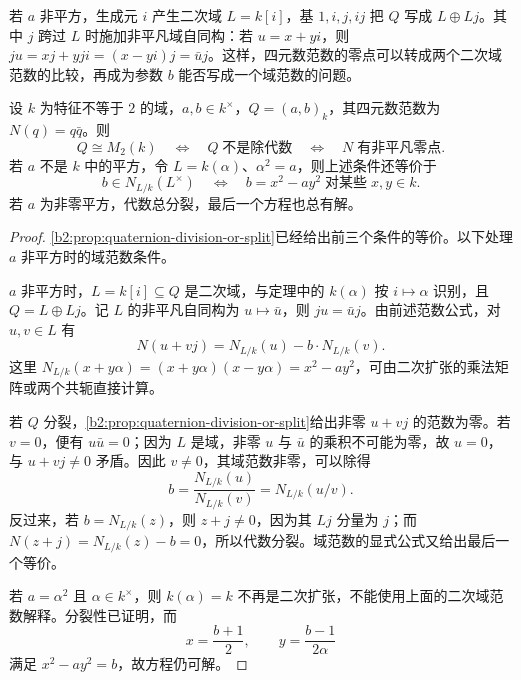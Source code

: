若 \(a\) 非平方，生成元 \(i\) 产生二次域 \(L=k[i]\)，基 \(1,i,j,ij\) 把 \(Q\) 写成 \(L\oplus Lj\)。其中 \(j\) 跨过 \(L\) 时施加非平凡域自同构：若 \(u=x+yi\)，则 \(ju=xj+yji=(x-yi)j=\bar u j\)。这样，四元数范数的零点可以转成两个二次域范数的比较，再成为参数 \(b\) 能否写成一个域范数的问题。

\begin{theorem}[四元数分裂的等价条件]\label{b2:thm:quaternion-splitting}
	设 \(k\) 为特征不等于 \(2\) 的域，\(a,b\in k^\times\)，\(Q=(a,b)_k\)，其四元数范数为 \(N(q)=q\bar q\)。则
	\[
		Q\cong M_2(k) \quad\Longleftrightarrow\quad Q\;\text{不是除代数} \quad\Longleftrightarrow\quad N\;\text{有非平凡零点}.
	\]
	若 \(a\) 不是 \(k\) 中的平方，令 \(L=k(\alpha)\)、\(\alpha^2=a\)，则上述条件还等价于
	\[
		b\in N_{L/k}(L^\times) \quad\Longleftrightarrow\quad b=x^2-a y^2\;\text{对某些}\;x,y\in k.
	\]
	若 \(a\) 为非零平方，代数总分裂，最后一个方程也总有解。
\end{theorem}
\begin{proof}
	\cref{b2:prop:quaternion-division-or-split}已经给出前三个条件的等价。以下处理 \(a\) 非平方时的域范数条件。

	\(a\) 非平方时，\(L=k[i]\subseteq Q\) 是二次域，与定理中的 \(k(\alpha)\) 按 \(i\mapsto\alpha\) 识别，且 \(Q=L\oplus Lj\)。记 \(L\) 的非平凡自同构为 \(u\mapsto\bar u\)，则 \(ju=\bar u j\)。由前述范数公式，对 \(u,v\in L\) 有
	\[
		N(u+vj)=N_{L/k}(u)-b\cdot N_{L/k}(v).
	\]
	这里 \(N_{L/k}(x+y\alpha)=(x+y\alpha)(x-y\alpha)=x^2-a y^2\)，可由二次扩张的乘法矩阵或两个共轭直接计算。

	若 \(Q\) 分裂，\cref{b2:prop:quaternion-division-or-split}给出非零 \(u+vj\) 的范数为零。若 \(v=0\)，便有 \(u\bar u=0\)；因为 \(L\) 是域，非零 \(u\) 与 \(\bar u\) 的乘积不可能为零，故 \(u=0\)，与 \(u+vj\ne0\) 矛盾。因此 \(v\ne0\)，其域范数非零，可以除得
	\[
		b=\frac{N_{L/k}(u)}{N_{L/k}(v)}=N_{L/k}(u/v).
	\]
	反过来，若 \(b=N_{L/k}(z)\)，则 \(z+j\ne0\)，因为其 \(Lj\) 分量为 \(j\)；而 \(N(z+j)=N_{L/k}(z)-b=0\)，所以代数分裂。域范数的显式公式又给出最后一个等价。

	若 \(a=\alpha^2\) 且 \(\alpha\in k^\times\)，则 \(k(\alpha)=k\) 不再是二次扩张，不能使用上面的二次域范数解释。分裂性已证明，而
	\[
		x=\frac{b+1}{2},\qquad y=\frac{b-1}{2\alpha}
	\]
	满足 \(x^2-a y^2=b\)，故方程仍可解。
\end{proof}

